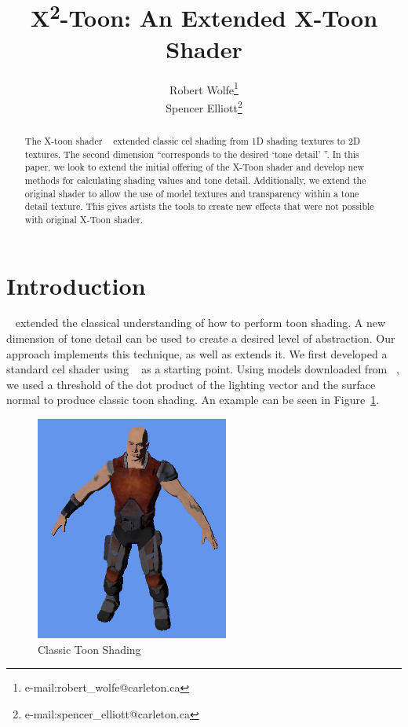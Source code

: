 \documentclass[annual]{acmsiggraph}
\title{X\texorpdfstring{\textsuperscript{2}}.-Toon: An Extended X-Toon Shader}
\author{Robert Wolfe\thanks{e-mail:robert\_wolfe@carleton.ca}\\Spencer Elliott\thanks{e-mail:spencer\_elliott@carleton.ca}}
\begin{document}
\maketitle

\begin{abstract}

The X-toon shader ~\cite{BTM06a} extended classic cel shading from 1D shading textures to 2D textures. The second dimension ``corresponds to the desired `tone detail' ''. In this paper, we look to extend the initial offering of the X-Toon shader and develop new methods for calculating shading values and tone detail. Additionally, we extend the original shader to allow the use of model textures and transparency within a tone detail texture. This gives artists the tools to create new effects that were not possible with original X-Toon shader.

\end{abstract}

\keywordlist

\copyrightspace

\section{Introduction}
~\cite{BTM06a} extended the classical understanding of how to perform toon shading. A new dimension of tone detail can be used to create a desired level of abstraction. Our approach implements this technique, as well as extends it. We first developed a standard cel shader using ~\cite{CelShadingTut} as a starting point. Using models downloaded from ~\cite{TurboSquid}, we used a threshold of the dot product of the lighting vector and the surface normal to produce classic toon shading. An example can be seen in Figure~\ref{fig:toonshade}.

\begin{figure}[h]
	\centering
	\includegraphics[width=2.5in]{images/classic_cel2}
	\caption{Classic Toon Shading}
	\label{fig:toonshade}
\end{figure}
\end{document}

